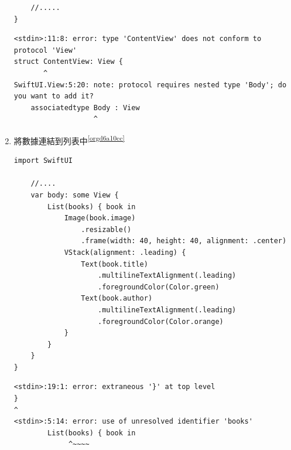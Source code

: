 \documentclass[a4paper,12pt]{article}
\begin{document}
\begin{enumerate}
\begin{lstlisting}
    //.....
}
\end{lstlisting}

\begin{verbatim}
<stdin>:11:8: error: type 'ContentView' does not conform to protocol 'View'
struct ContentView: View {
       ^
SwiftUI.View:5:20: note: protocol requires nested type 'Body'; do you want to add it?
    associatedtype Body : View
                   ^
\end{verbatim}

\item 將數據連結到列表中\textsuperscript{\ref{orgd6a10cc}}
\label{sec:org0639967}
\lstset{breaklines=true,language=swift,label= ,caption= ,captionpos=b,firstnumber=1,numbers=left}
\begin{lstlisting}
import SwiftUI

    //....
    var body: some View {
        List(books) { book in
            Image(book.image)
                .resizable()
                .frame(width: 40, height: 40, alignment: .center)
            VStack(alignment: .leading) {
                Text(book.title)
                    .multilineTextAlignment(.leading)
                    .foregroundColor(Color.green)
                Text(book.author)
                    .multilineTextAlignment(.leading)
                    .foregroundColor(Color.orange)
            }
        }
    }
}
\end{lstlisting}

\begin{verbatim}
<stdin>:19:1: error: extraneous '}' at top level
}
^
<stdin>:5:14: error: use of unresolved identifier 'books'
        List(books) { book in
             ^~~~~
\end{verbatim}


\end{enumerate}
\end{document}
